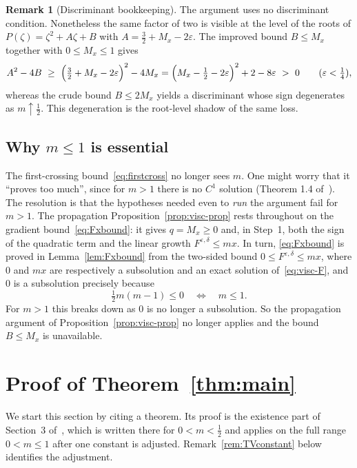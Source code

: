 \documentclass[12pt]{amsart}
\numberwithin{equation}{section}
\theoremstyle{plain}
\theoremstyle{definition}
\newtheorem{remark}[theorem]{Remark}
\newcommand{\eps}{\varepsilon}
\begin{document}
\begin{remark}[Discriminant bookkeeping]\label{rem:discriminant}
	The argument uses no discriminant condition. Nonetheless the same
	factor of two
	is visible at the level of the roots of $P(\zeta)=\zeta^2+A\zeta+B$ with
	$A=\tfrac32+M_x-2\eps$. The improved bound $B\le M_x$ together with
	$0\le M_x\le1$ gives
	\[
		A^2-4B\ \ge\ \Bigl(\tfrac32+M_x-2\eps\Bigr)^2-4M_x
		=\Bigl(M_x-\tfrac12-2\eps\Bigr)^2+2-8\eps\ >\ 0\qquad(\eps<\tfrac14),
	\]
	whereas the crude bound $B\le2M_x$ yields a discriminant whose sign
	degenerates
	as $m\uparrow\tfrac12$. This degeneration is the root-level shadow of the
	same loss.
\end{remark}

\subsection{Why $m\le1$ is essential}
The first-crossing bound~\eqref{eq:firstcross} no longer sees $m$.
One might worry that it ``proves too much'', since for $m>1$ there is
no $C^1$ solution
(Theorem 1.4 of~\cite{TV}).
The resolution is that the hypotheses needed even to
\emph{run} the argument fail for $m>1$. The propagation
Proposition~\ref{prop:visc-prop} rests throughout on the gradient
bound~\eqref{eq:Fxbound}: it gives $q=M_x\ge0$ and, in Step~1, both the sign of
the quadratic term and the linear growth $F^{\eps,\delta}\le mx$. In turn,
\eqref{eq:Fxbound} is proved in Lemma~\ref{lem:Fxbound} from the two-sided
bound
$0\le F^{\eps,\delta}\le mx$, where $0$ and $mx$ are respectively a subsolution
and an exact solution of~\eqref{eq:visc-F}, and $0$ is a subsolution precisely
because
\[
	\tfrac12 m(m-1)\le0\quad\Longleftrightarrow\quad m\le1 .
\]
For $m>1$ this breaks
down as $0$ is no longer a subsolution.
So the propagation argument of
Proposition~\ref{prop:visc-prop} no longer applies and the bound $B\le M_x$
is unavailable.

\section{Proof of Theorem~\ref{thm:main}}\label{sec:completion}

We start this section by citing a theorem. Its proof is the existence part of
Section~3 of~\cite{TV}, which is written there for $0<m<\tfrac12$ and applies
on the full range $0<m\le1$ after one constant is adjusted.
Remark~\ref{rem:TVconstant} below identifies the adjustment.
\end{document}
